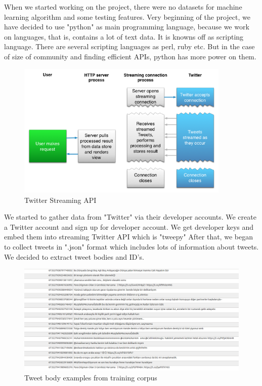 \documentclass[12pt]{comjnl}
\begin{document}
When we started working on the project, there were no datasets for machine learning algorithm and some testing features.
Very beginning of the project, we have decided to use "python" as main programming language, because we work on languages, that is, contains a lot of text data. It is knowns off as scripting language. There are several scripting languages as perl, ruby etc. But in the case of size of community and finding efficient APIs, python has more power on them.

\begin{figure}[htbp]
\centering
\includegraphics[width=4in]{streaming.png}
\caption{Twitter Streaming API}\label{fig:api}
\end{figure}

We started to gather data from "Twitter" via their developer accounts. We create a Twitter account and sign up for developer account. We get developer keys and embed them into streaming Twitter API which is "tweepy" After that, we began to collect tweets in ".json" format which includes lots of information about tweets. We decided to extract tweet bodies and ID's.

\begin{figure}[htbp]
\centering
\includegraphics[width=7in]{textdatabase.png}
\caption{Tweet body examples from training corpus}\label{fig:model}
\end{figure}
\end{document}
